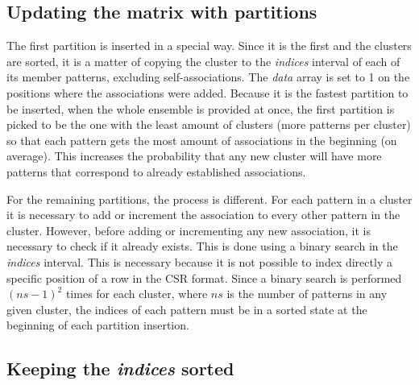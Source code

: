 \subsection{Updating the matrix with partitions}

The first partition is inserted in a special way.
Since it is the first and the clusters are sorted, it is a matter of copying the cluster to the \emph{indices} interval of each of its member patterns, excluding self-associations.
The \emph{data} array is set to 1 on the positions where the associations were added.
Because it is the fastest partition to be inserted, when the whole ensemble is provided at once, the first partition is picked to be the one with the least amount of clusters (more patterns per cluster) so that each pattern gets the most amount of associations in the beginning (on average).
This increases the probability that any new cluster will have more patterns that correspond to already established associations.

For the remaining partitions, the process is different.
For each pattern in a cluster it is necessary to add or increment the association to every other pattern in the cluster.
However, before adding or incrementing any new association, it is necessary to check if it already exists.
This is done using a binary search in the \emph{indices} interval.
This is necessary because it is not possible to index directly a specific position of a row in the CSR format.
Since a binary search is performed $(ns - 1)^2$ times for each cluster, where $ns$ is the number of patterns in any given cluster, the indices of each pattern must be in a sorted state at the beginning of each partition insertion.

\subsection{Keeping the \emph{indices} sorted}



